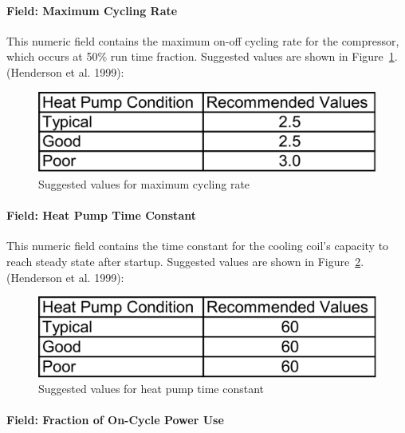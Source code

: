 \paragraph{Field: Maximum Cycling Rate}\label{field-maximum-cycling-rate-001}

This numeric field contains the maximum on-off cycling rate for the compressor, which occurs at 50\% run time fraction. Suggested values are shown in Figure~\ref{fig:suggested-values-for-maximum-cycling-rate}. (Henderson et al. 1999):

\begin{figure}[htbp]
\centering
\includegraphics{media/image295.png}
\caption{Suggested values for maximum cycling rate \protect \label{fig:suggested-values-for-maximum-cycling-rate}}
\end{figure}

\paragraph{Field: Heat Pump Time Constant}\label{field-heat-pump-time-constant-000}

This numeric field contains the time constant for the cooling coil's capacity to reach steady state after startup. Suggested values are shown in Figure~\ref{fig:suggested-values-for-heat-pump-time-constant}. (Henderson et al. 1999):

\begin{figure}[htbp]
\centering
\includegraphics{media/image296.png}
\caption{Suggested values for heat pump time constant \protect \label{fig:suggested-values-for-heat-pump-time-constant}}
\end{figure}

\paragraph{Field: Fraction of On-Cycle Power Use}\label{field-fraction-of-on-cycle-power-use-000}

